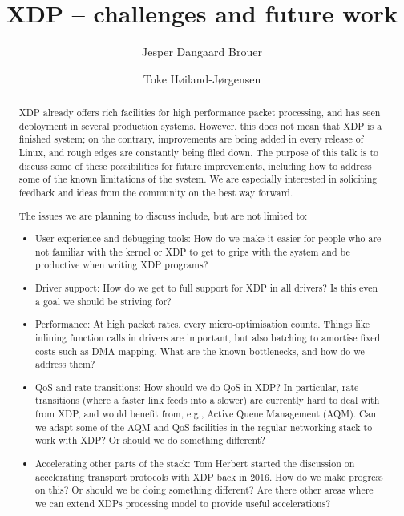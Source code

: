 \documentclass[sigconf]{acmart}
\begin{document}
\title{XDP -- challenges and future work}
\author{Jesper Dangaard Brouer}

\author{Toke Høiland-Jørgensen}


\captionsetup{font+=small}


\begin{abstract}
XDP already offers rich facilities for high performance packet
processing, and has seen deployment in several production
systems. However, this does not mean that XDP is a finished system; on
the contrary, improvements are being added in every release of Linux,
and rough edges are constantly being filed down. The purpose of this
talk is to discuss some of these possibilities for future
improvements, including how to address some of the known limitations
of the system. We are especially interested in soliciting feedback and
ideas from the community on the best way forward.

The issues we are planning to discuss include, but are not limited to:

\begin{itemize}
\item User experience and debugging tools: How do we make it easier for people
  who are not familiar with the kernel or XDP to get to grips with the system
  and be productive when writing XDP programs?

\item Driver support: How do we get to full support for XDP in all drivers? Is
  this even a goal we should be striving for?

\item Performance: At high packet rates, every micro-optimisation counts. Things
  like inlining function calls in drivers are important, but also batching to
  amortise fixed costs such as DMA mapping. What are the known bottlenecks, and
  how do we address them?

\item QoS and rate transitions: How should we do QoS in XDP? In particular, rate
  transitions (where a faster link feeds into a slower) are currently hard to
  deal with from XDP, and would benefit from, e.g., Active Queue Management
  (AQM). Can we adapt some of the AQM and QoS facilities in the regular
  networking stack to work with XDP? Or should we do something different?

\item Accelerating other parts of the stack: Tom Herbert started the discussion
  on accelerating transport protocols with XDP back in 2016. How do we make
  progress on this? Or should we be doing something different? Are there other
  areas where we can extend XDPs processing model to provide useful
  accelerations?
\end{itemize}

\end{abstract}
\end{document}

